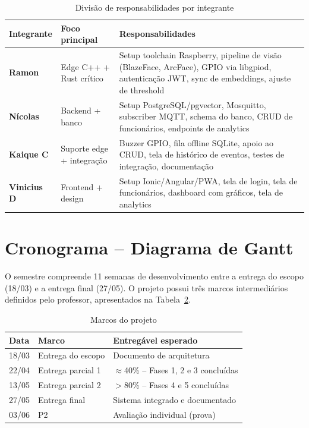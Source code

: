 \documentclass[12pt,a4paper]{report}
\begin{document}
\begin{table}[H]
\centering
\caption{Divisão de responsabilidades por integrante}
\label{tab:divisao}
\begin{tabular}{>{\bfseries}p{2.8cm} p{3.5cm} p{7cm}}
\toprule
Integrante & Foco principal & Responsabilidades \\
\midrule
Ramon & Edge C++ + Rust crítico &
    Setup toolchain Raspberry, pipeline de visão (BlazeFace, ArcFace),
    GPIO via libgpiod, autenticação JWT, sync de embeddings, ajuste de threshold \\
\addlinespace
Nícolas & Backend + banco &
    Setup PostgreSQL/pgvector, Mosquitto, subscriber MQTT,
    schema do banco, CRUD de funcionários, endpoints de analytics \\
\addlinespace
Kaique C & Suporte edge + integração &
    Buzzer GPIO, fila offline SQLite, apoio ao CRUD,
    tela de histórico de eventos, testes de integração, documentação \\
\addlinespace
Vinicius D & Frontend + design &
    Setup Ionic/Angular/PWA, tela de login, tela de funcionários,
    dashboard com gráficos, tela de analytics \\
\bottomrule
\end{tabular}
\end{table}

\section{Cronograma -- Diagrama de Gantt}

O semestre compreende 11 semanas de desenvolvimento entre a entrega do escopo (18/03) e a entrega final (27/05). O projeto possui três marcos intermediários definidos pelo professor, apresentados na Tabela~\ref{tab:marcos}.

\begin{table}[H]
\centering
\caption{Marcos do projeto}
\label{tab:marcos}
\begin{tabular}{lll}
\toprule
Data & Marco & Entregável esperado \\
\midrule
18/03 & Entrega do escopo & Documento de arquitetura \\
22/04 & Entrega parcial 1 & $\approx$40\% -- Fases 1, 2 e 3 concluídas \\
13/05 & Entrega parcial 2 & $>$80\% -- Fases 4 e 5 concluídas \\
27/05 & Entrega final & Sistema integrado e documentado \\
03/06 & P2 & Avaliação individual (prova) \\
\bottomrule
\end{tabular}
\end{table}
\end{document}
